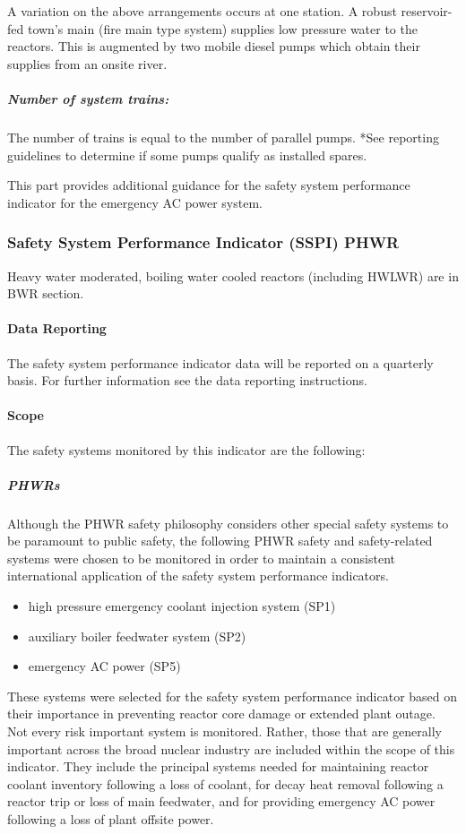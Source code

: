 A variation on the above arrangements occurs at one station. A robust
reservoir-fed town's main (fire main type system) supplies low
pressure water to the reactors. This is augmented by two mobile diesel
pumps which obtain their supplies from an onsite river.

\subparagraph{Number of system trains:}  The number of trains is equal to the number of parallel pumps.
*See reporting guidelines to determine if some pumps qualify as
installed spares.

This part provides additional guidance for the safety system
performance indicator for the emergency AC power system.


\subsubsection{Safety System Performance Indicator (SSPI) PHWR}

Heavy water moderated, boiling water cooled reactors (including HWLWR)
are in BWR section.

\paragraph{Data Reporting}

The safety system performance indicator data will be reported on a
quarterly basis. For further information see the data reporting
instructions.

\paragraph{Scope}

The safety systems monitored by this indicator are the following:

\subparagraph{PHWRs}

Although the PHWR safety philosophy considers other special safety
systems to be paramount to public safety, the following PHWR safety
and safety-related systems were chosen to be monitored in order to
maintain a consistent international application of the safety system
performance indicators.
\begin{itemize}
\item high pressure emergency coolant injection system (SP1)
\item auxiliary boiler feedwater system (SP2)
\item emergency AC power (SP5)
\end{itemize}

These systems were selected for the safety system performance
indicator based on their importance in preventing reactor core damage
or extended plant outage. Not every risk important system is
monitored. Rather, those that are generally important across the broad
nuclear industry are included within the scope of this indicator. They
include the principal systems needed for maintaining reactor coolant
inventory following a loss of coolant, for decay heat removal
following a reactor trip or loss of main feedwater, and for providing
emergency AC power following a loss of plant offsite power.

